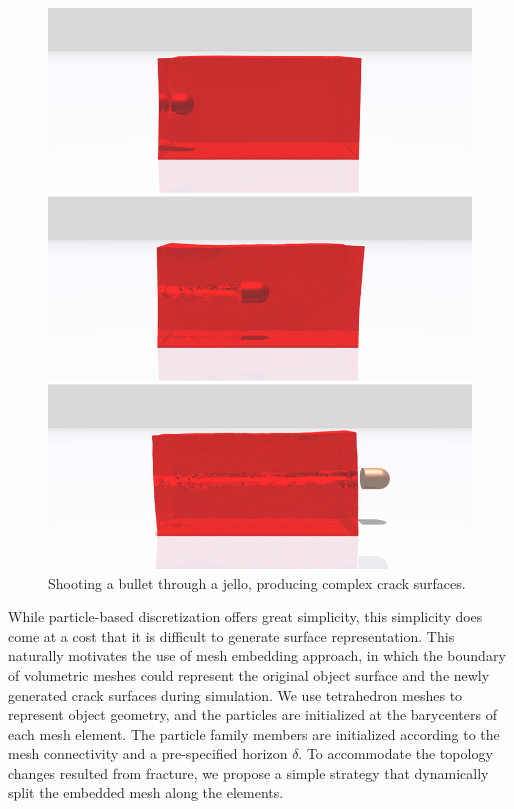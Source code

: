 \begin{figure}[t]
  \centering
  \includegraphics[width=\linewidth]{../figs/demo_jello.png}
  \caption{\label{fig:7}
  Shooting a bullet through a jello, producing complex crack surfaces.
}
\end{figure}
While particle-based discretization offers great simplicity, this simplicity does come at a cost that it is difficult to generate surface representation. This naturally motivates the use of mesh embedding approach, in which the boundary of volumetric meshes could represent the original object surface and the newly generated crack surfaces during simulation. We use tetrahedron meshes to represent object geometry, and the particles are initialized at the barycenters of each mesh element.
The particle family members are initialized according to the mesh connectivity and a pre-specified horizon $\delta$.
To accommodate the topology changes resulted from fracture, we propose a simple strategy that dynamically split the embedded mesh along the elements.

